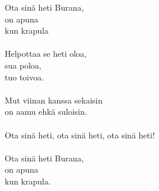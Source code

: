 
Ota sinä heti Burana, \\ on apuna \\ kun krapula \\ \hspace{10mm} \\ Helpottaa se heti oloa, \\ sua poloa, \\ tuo toivoa. \\ \hspace{10mm} \\ Mut viinan kanssa sekaisin \\ on aamu ehkä suloisin. \\ \hspace{10mm} \\ Ota sinä heti, ota sinä heti, ota sinä heti! \\ \hspace{10mm} \\ Ota sinä heti Burana, \\ on apuna \\ kun krapula.